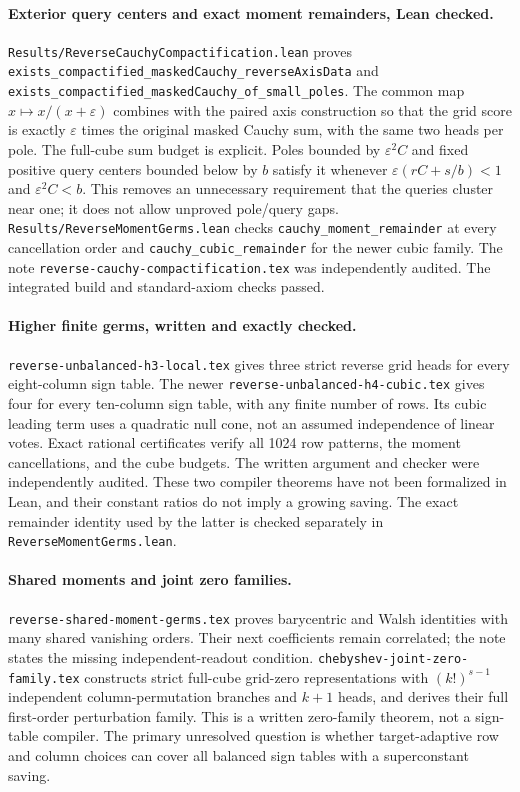 \documentclass[11pt]{article}
\begin{document}
\paragraph{Exterior query centers and exact moment remainders, Lean checked.}
\texttt{Results/ReverseCauchyCompactification.lean} proves
\texttt{exists\_compactified\_maskedCauchy\_reverseAxisData} and
\texttt{exists\_compactified\_maskedCauchy\_of\_small\_poles}.
The common map $x\mapsto x/(x+\varepsilon)$ combines with the paired
axis construction so that the grid score is exactly $\varepsilon$
times the original masked Cauchy sum, with the same two heads per pole.
The full-cube sum budget is explicit. Poles bounded by
$\varepsilon^2 C$ and fixed positive query centers bounded below by
$b$ satisfy it whenever $\varepsilon(rC+s/b)<1$ and
$\varepsilon^2C<b$. This removes an unnecessary requirement that the
queries cluster near one; it does not allow unproved pole/query gaps.
\texttt{Results/ReverseMomentGerms.lean} checks
\texttt{cauchy\_moment\_remainder} at every cancellation order and
\texttt{cauchy\_cubic\_remainder} for the newer cubic family.
The note \texttt{reverse-cauchy-compactification.tex} was independently
audited. The integrated build and standard-axiom checks passed.

\paragraph{Higher finite germs, written and exactly checked.}
\texttt{reverse-unbalanced-h3-local.tex} gives three strict reverse
grid heads for every eight-column sign table. The newer
\texttt{reverse-unbalanced-h4-cubic.tex} gives four for every ten-column
sign table, with any finite number of rows. Its cubic leading term uses
a quadratic null cone, not an assumed independence of linear votes.
Exact rational certificates verify all 1024 row patterns, the moment
cancellations, and the cube budgets. The written argument and checker
were independently audited. These two compiler theorems have not been
formalized in Lean, and their constant ratios do not imply a growing
saving. The exact remainder identity used by the latter is checked
separately in \texttt{ReverseMomentGerms.lean}.

\paragraph{Shared moments and joint zero families.}
\texttt{reverse-shared-moment-germs.tex} proves barycentric and Walsh
identities with many shared vanishing orders. Their next coefficients
remain correlated; the note states the missing independent-readout
condition. \texttt{chebyshev-joint-zero-family.tex} constructs strict
full-cube grid-zero representations with $(k!)^{s-1}$ independent
column-permutation branches and $k+1$ heads, and derives their full
first-order perturbation family. This is a written zero-family theorem,
not a sign-table compiler. The primary unresolved question is whether
target-adaptive row and column choices can cover all balanced sign
tables with a superconstant saving.
\end{document}
